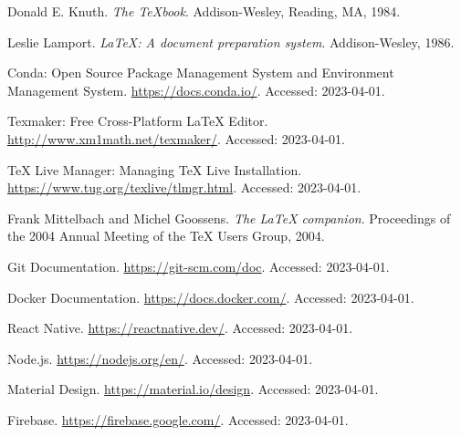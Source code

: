 \newpage
\begin{thebibliography}{9}

Donald E. Knuth.
\textit{The TeXbook}.
Addison-Wesley, Reading, MA, 1984.

Leslie Lamport.
\textit{\LaTeX: A document preparation system}.
Addison-Wesley, 1986.

Conda: Open Source Package Management System and Environment Management System.
\url{https://docs.conda.io/}.
Accessed: 2023-04-01.

Texmaker: Free Cross-Platform LaTeX Editor.
\url{http://www.xm1math.net/texmaker/}.
Accessed: 2023-04-01.

TeX Live Manager: Managing TeX Live Installation.
\url{https://www.tug.org/texlive/tlmgr.html}.
Accessed: 2023-04-01.

Frank Mittelbach and Michel Goossens.
\textit{The LaTeX companion}.
Proceedings of the 2004 Annual Meeting of the TeX Users Group, 2004.

Git Documentation.
\url{https://git-scm.com/doc}.
Accessed: 2023-04-01.

Docker Documentation.
\url{https://docs.docker.com/}.
Accessed: 2023-04-01.

React Native.
\url{https://reactnative.dev/}.
Accessed: 2023-04-01.

Node.js.
\url{https://nodejs.org/en/}.
Accessed: 2023-04-01.

Material Design.
\url{https://material.io/design}.
Accessed: 2023-04-01.

Firebase.
\url{https://firebase.google.com/}.
Accessed: 2023-04-01.


\end{thebibliography}



 \documentclass{article}
